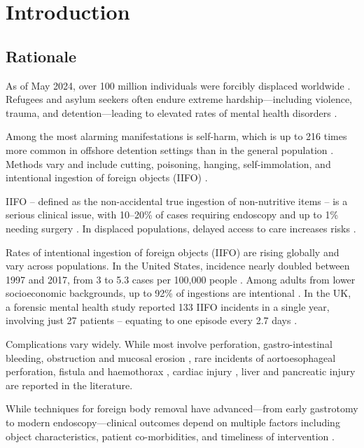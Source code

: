 \section{Introduction}

\subsection{Rationale}
As of May 2024, over 100 million individuals were forcibly displaced worldwide \cite{UNHCR_2022}. Refugees and asylum seekers often endure extreme hardship—including violence, trauma, and detention—leading to elevated rates of mental health disorders \cite{UNHCR_2010, AmnestyInternational_2024, Athwal_2015, Sundvall_2015, Nickerson_2019, Bevione_2024}. 

Among the most alarming manifestations is self-harm, which is up to 216 times more common in offshore detention settings than in the general population \cite{vonWerthern_2018, Hedrick_2019, GlobalDetentionProject_2024}. Methods vary and include cutting, poisoning, hanging, self-immolation, and intentional ingestion of foreign objects (IIFO) \cite{Davidson_2016, Hedrick_2019, Ajdacic-Gross_2008}.

IIFO -- defined as the non-accidental true ingestion of non-nutritive items -- is a serious clinical issue, with 10–20\% of cases requiring endoscopy and up to 1\% needing surgery \cite{Becq_2021, Ikenberry_2011, Birk_2016}. In displaced populations, delayed access to care increases risks \cite{Vujkovic_2019}. 

Rates of intentional ingestion of foreign objects (IIFO) are rising globally and vary across populations. In the United States, incidence nearly doubled between 1997 and 2017, from 3 to 5.3 cases per 100,000 people \cite{Hsieh_2020}. Among adults from lower socioeconomic backgrounds, up to 92\% of ingestions are intentional \cite{Hsieh_2020, Palta_2009}. In the UK, a forensic mental health study reported 133 IIFO incidents in a single year, involving just 27 patients -- equating to one episode every 2.7 days \cite{Tromans_2019}.

Complications vary widely. While most involve perforation, gastro-intestinal bleeding, obstruction and mucosal erosion \cite{Ikenberry_2011}, rare incidents of aortoesophageal perforation, fistula and haemothorax \cite{Hunt_2007f}, cardiac injury \cite{Udemgba_2021f}, liver \cite{Zhao_2022e} and pancreatic injury \cite{Bozorgmehr_2022f} are reported in the literature.

While techniques for foreign body removal have advanced—from early gastrotomy to modern endoscopy—clinical outcomes depend on multiple factors including object characteristics, patient co-morbidities, and timeliness of intervention \cite{Moehlau_1895, Saint_1929, Barros_1991, Lerche_1911, Jackson_1957, Ricote_1985, Chalk_1928, Ikenberry_2011}.

